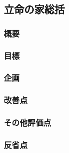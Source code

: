 \subsection*{立命の家総括}


\subsubsection*{概要}
\subsubsection*{目標}
\subsubsection*{企画}
\subsubsection*{改善点}
\subsubsection*{その他評価点}
\subsubsection*{反省点}